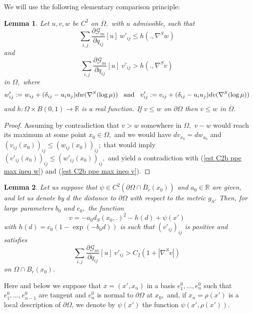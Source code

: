 \documentclass[10pt,reqno,oneside]{amsart}
\newtheorem{lem}{Lemma}[section]
\theoremstyle{definition}
\theoremstyle{remark}
\newcommand{\R}{\mathbb{R}}
\begin{document}
We will use the following elementary comparison principle:
\begin{lem}\label{est C2b ppe comp w'}
Let $u,v,w$ be $C^2$ on $\overline{\Omega},$ with $u$ admissible, such that
\begin{equation}\label{est C2b ppe max ineq w}
\sum_{i,j}\frac{\partial\mathcal{G}_m}{\partial q_{ij}}[u]\ w'_{ij}\leq h(.,\nabla^S w)
\end{equation}
and 
\begin{equation}\label{est C2b ppe max ineq v}
\sum_{i,j}\frac{\partial\mathcal{G}_m}{\partial q_{ij}}[u]\ v'_{ij}> h(.,\nabla^S v)
\end{equation}
in $\Omega,$ where
$$w'_{ij}:=w_{ij}+(\delta_{ij}-u_iu_j)dw(\nabla^S(\log\mu))\hspace{.3cm}\mbox{and}\hspace{.3cm}v'_{ij}:=v_{ij}+(\delta_{ij}-u_iu_j)dv(\nabla^S(\log\mu))$$
and $h:\Omega\times B(0,1)\rightarrow\R$ is a real function. 
If $v\leq w$ on $\partial\Omega$ then $v\leq w$ in $\overline{\Omega}.$
\end{lem}
\begin{proof}
Assuming by contradiction that $v>w$ somewhere in $\Omega,$ $v-w$ would reach its maximum at some point $x_0\in\Omega,$ and we would have $dv_{x_0}=dw_{x_0}$ and $(v_{ij}(x_0))_{ij}\leq (w_{ij}(x_0))_{ij};$ that would imply $(v'_{ij}(x_0))_{ij}\leq (w'_{ij}(x_0))_{ij},$ and yield a contradiction with (\ref{est C2b ppe max ineq w}) and (\ref{est C2b ppe max ineq v}).
\end{proof}
\begin{lem}
Let us suppose that $\psi\in C^2(\partial\Omega\cap\overline{B}_{r}(x_0))$ and $a_0\in\R$ are given, and let us denote by $d$ the distance to $\partial\Omega$ with respect to the metric $g_S.$ Then, for large parameters $b_0$ and $c_0,$ the function
\begin{equation}\label{def v estC2b}
v=-a_0d_S(x_0,.)^2-h(d)+\psi(x')
\end{equation}
with $h(d)=c_0(1-\exp(-b_0d))$ is such that $(v'_{ij})_{ij}$ is positive and satisfies
\begin{equation}\label{est C2b ineq vpij}
\sum_{i,j}\frac{\partial\mathcal{G}_m}{\partial q_{ij}}[u]\ v'_{ij}> C_2(1+|\nabla^S v|)
\end{equation}
on $\Omega\cap B_r(x_0).$
\end{lem}
Here and below we suppose that $x=(x',x_n)$ in a basis $e_1^0,\ldots,e_n^0$ such that $e_1^0,\ldots,e_{n-1}^0$ are tangent and $e_n^0$ is normal to $\partial\Omega$ at $x_0,$ and, if $x_n=\rho(x')$ is a local description of $\partial\Omega$, we denote by $\psi(x')$ the function $\psi(x',\rho(x')).$
\end{document}
